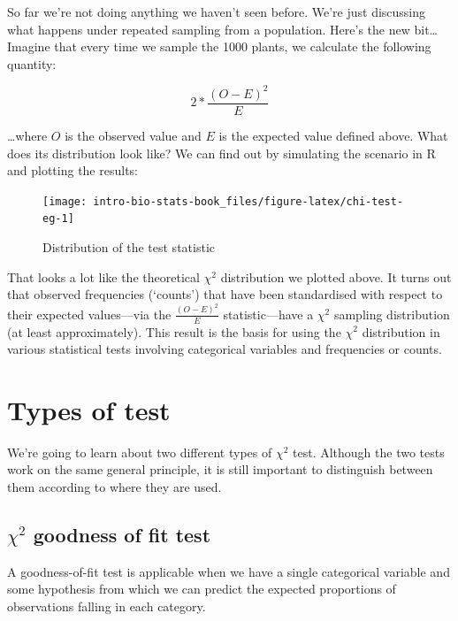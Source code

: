\documentclass[
]{book}
\begin{document}
So far we're not doing anything we haven't seen before. We're just discussing what happens under repeated sampling from a population. Here's the new bit\ldots{} Imagine that every time we sample the 1000 plants, we calculate the following quantity:

\[2*\frac{(O-E)^{2}}{E}\]

\ldots where \(O\) is the observed value and \(E\) is the expected value defined above. What does its distribution look like? We can find out by simulating the scenario in R and plotting the results:

\begin{figure}

{\centering \texttt{[image: intro-bio-stats-book\_files/figure-latex/chi-test-eg-1]} 

}

\caption{Distribution of the test statistic}\label{fig:chi-test-eg}
\end{figure}

That looks a lot like the theoretical \(\chi^2\) distribution we plotted above. It turns out that observed frequencies (`counts') that have been standardised with respect to their expected values---via the \(\frac{(O-E)^{2}}{E}\) statistic---have a \(\chi^2\) sampling distribution (at least approximately). This result is the basis for using the \(\chi^2\) distribution in various statistical tests involving categorical variables and frequencies or counts.

\hypertarget{types-of-test}{%
\section{Types of test}\label{types-of-test}}

We're going to learn about two different types of \(\chi^2\) test. Although the two tests work on the same general principle, it is still important to distinguish between them according to where they are used.

\hypertarget{chi2-goodness-of-fit-test}{%
\subsection{\texorpdfstring{\(\chi^{2}\) goodness of fit test}{\textbackslash chi\^{}\{2\} goodness of fit test}}\label{chi2-goodness-of-fit-test}}

A goodness-of-fit test is applicable when we have a single categorical variable and some hypothesis from which we can predict the expected proportions of observations falling in each category.
\end{document}
